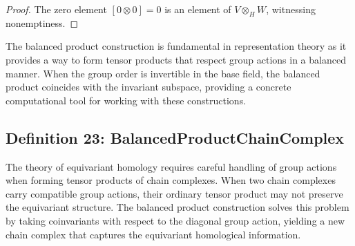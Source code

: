 \documentclass[11pt]{article}
\theoremstyle{plain}
\theoremstyle{definition}
\theoremstyle{remark}
\begin{document}
\begin{proof}
The zero element $[0 \otimes 0] = 0$ is an element of $V \otimes_H W$, witnessing nonemptiness.
\end{proof}

The balanced product construction is fundamental in representation theory as it provides a way to form tensor products that respect group actions in a balanced manner. When the group order is invertible in the base field, the balanced product coincides with the invariant subspace, providing a concrete computational tool for working with these constructions.

\vspace{1em}

\subsection{Definition 23: BalancedProductChainComplex}

The theory of equivariant homology requires careful handling of group actions when forming tensor products of chain complexes. When two chain complexes carry compatible group actions, their ordinary tensor product may not preserve the equivariant structure. The balanced product construction solves this problem by taking coinvariants with respect to the diagonal group action, yielding a new chain complex that captures the equivariant homological information.
\end{document}
